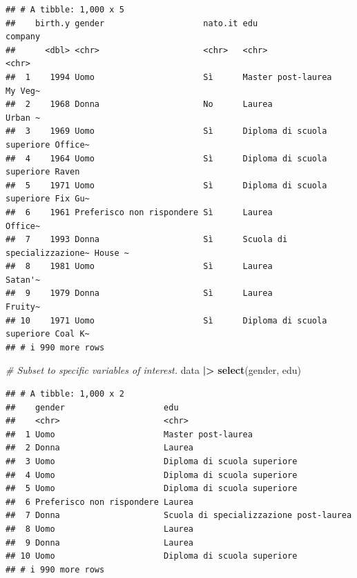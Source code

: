 \documentclass[
]{book}
\newenvironment{Shaded}{\begin{snugshade}}{\end{snugshade}}
\newcommand{\CommentTok}[1]{\textcolor[rgb]{0.56,0.35,0.01}{\textit{#1}}}
\newcommand{\FunctionTok}[1]{\textcolor[rgb]{0.13,0.29,0.53}{\textbf{#1}}}
\newcommand{\NormalTok}[1]{#1}
\newcommand{\SpecialCharTok}[1]{\textcolor[rgb]{0.81,0.36,0.00}{\textbf{#1}}}
\begin{document}
\begin{verbatim}
## # A tibble: 1,000 x 5
##    birth.y gender                    nato.it edu                         company
##      <dbl> <chr>                     <chr>   <chr>                       <chr>  
##  1    1994 Uomo                      Sì      Master post-laurea          My Veg~
##  2    1968 Donna                     No      Laurea                      Urban ~
##  3    1969 Uomo                      Sì      Diploma di scuola superiore Office~
##  4    1964 Uomo                      Sì      Diploma di scuola superiore Raven  
##  5    1971 Uomo                      Sì      Diploma di scuola superiore Fix Gu~
##  6    1961 Preferisco non rispondere Sì      Laurea                      Office~
##  7    1993 Donna                     Sì      Scuola di specializzazione~ House ~
##  8    1981 Uomo                      Sì      Laurea                      Satan'~
##  9    1979 Donna                     Sì      Laurea                      Fruity~
## 10    1971 Uomo                      Sì      Diploma di scuola superiore Coal K~
## # i 990 more rows
\end{verbatim}

\begin{Shaded}
\begin{Highlighting}[]
\CommentTok{\# Subset to specific variables of interest.}
\NormalTok{data }\SpecialCharTok{|\textgreater{}} 
  \FunctionTok{select}\NormalTok{(gender, edu)}
\end{Highlighting}
\end{Shaded}

\begin{verbatim}
## # A tibble: 1,000 x 2
##    gender                    edu                                   
##    <chr>                     <chr>                                 
##  1 Uomo                      Master post-laurea                    
##  2 Donna                     Laurea                                
##  3 Uomo                      Diploma di scuola superiore           
##  4 Uomo                      Diploma di scuola superiore           
##  5 Uomo                      Diploma di scuola superiore           
##  6 Preferisco non rispondere Laurea                                
##  7 Donna                     Scuola di specializzazione post-laurea
##  8 Uomo                      Laurea                                
##  9 Donna                     Laurea                                
## 10 Uomo                      Diploma di scuola superiore           
## # i 990 more rows
\end{verbatim}
\end{document}
